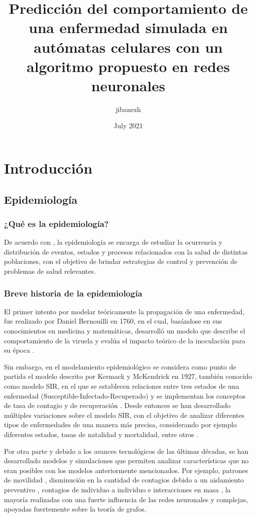 \documentclass{article}
\title{Predicción del comportamiento de una enfermedad simulada en autómatas celulares con un algoritmo propuesto en redes neuronales}
\author{jibanezh }
\date{July 2021}
\begin{document}
\maketitle

\section{Introducción}

\subsection{Epidemiología}

\subsubsection{¿Qué es la epidemiología?}
De acuerdo con \cite{epiDictionary}, la epidemiología se encarga de estudiar la ocurrencia y distribución de eventos, estados y procesos relacionados con la salud de distintas poblaciones, con el objetivo de brindar estrategias de control y prevención de problemas de salud relevantes.

\subsubsection{Breve historia de la epidemiología} 

El primer intento por modelar teóricamente la propagación de una enfermedad, fue realizado por Daniel Bernouilli en 1760, en el cual, basándose en sus conocimientos en medicina y matemáticas, desarrolló un modelo que describe el comportamiento de la viruela y evalúa el impacto teórico de la inoculación para su época \cite{shortHistory}. 

Sin embargo, en el modelamiento epidemiológico se considera como punto de partida el modelo descrito por Kermack y McKendrick en 1927, también conocido como modelo SIR, en el que se establecen relaciones entre tres estados de una enfermedad (Susceptible-Infectado-Recuperado) y se implementan los conceptos de tasa de contagio y de recuperación \cite{malariaSIR}. Desde entonces se han desarrollado múltiples variaciones sobre el modelo SIR, con el objetivo de analizar diferentes tipos de enfermedades de una manera más precisa, considerando por ejemplo diferentes estados, tasas de natalidad y mortalidad, entre otros \cite{diego2010}.

Por otra parte y debido a los avances tecnológicos de las últimas décadas, se han desarrollado modelos y simulaciones que permiten analizar características que no eran posibles con los modelos anteriormente mencionados. Por ejemplo, patrones de movilidad \cite{colaGNN, epidemiologicalNeuralNetwork}, disminución en la cantidad de contagios debido a un aislamiento preventivo \cite{stayHome}, contagios de individuo a individuo \cite{heterogeneousPopulation} e interacciones en masa \cite{combiningGraph, transfer2021}, la mayoría realizadas con una fuerte influencia de las redes neuronales y complejas, apoyadas fuertemente sobre la teoría de grafos.
\end{document}

